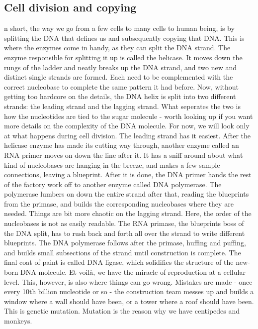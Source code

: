 \subsection*{Cell division and copying}
n short, the way we go from a few cells to many cells to human being, is by splitting the DNA that defines us and subsequently copying that DNA.
This is where the enzymes come in handy, as they can split the DNA strand.
The enzyme responsible for splitting it up is called the helicase.
It moves down the rungs of the ladder and neatly breaks up the DNA strand, and two new and distinct single strands are formed.
Each need to be complemented with the correct nucleobase to complete the same pattern it had before.
Now, without getting too hardcore on the details, the DNA helix is split into two different strands: the leading strand and the lagging strand.
What seperates the two is how the nucleotides are tied to the sugar molecule - worth looking up if you want more details on the complexity of the DNA molecule.
For now, we will look only at what happens during cell division.
The leading strand has it easiest.
After the helicase enzyme has made its cutting way through, another enzyme called an RNA primer moves on down the line after it.
It has a sniff around about what kind of nucleobases are hanging in the breeze, and makes a few sample connections, leaving a blueprint.
After it is done, the DNA primer hands the rest of the factory work off to another enzyme called DNA polymerase.
The polymerase lumbers on down the entire strand after that, reading the blueprints from the primase, and builds the corresponding nucleobases where they are needed. 
Things are bit more chaotic on the lagging strand.
Here, the order of the nucleobases is not as easily readable.
The RNA primase, the blueprints boss of the DNA split, has to rush back and forth all over the strand to write different blueprints.
The DNA polymerase follows after the primase, huffing and puffing, and builds small subsections of the strand until construction is complete.
The final coat of paint is called DNA ligase, which solidifies the structure of the new-born DNA molecule.
Et voilà, we have the miracle of reproduction at a cellular level.
This, however, is also where things can go wrong.
Mistakes are made - once every 10th billion nucleotide or so - the construction team messes up and builds a window where a wall should have been, or a tower where a roof should have been.
This is genetic mutation.
Mutation is the reason why we have centipedes and monkeys.

